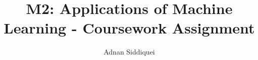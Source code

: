 \documentclass[a4paper,11pt]{article}
\title{\boldmath M2: Applications of Machine Learning - Coursework Assignment}
\author{Adnan Siddiquei}
\affiliation{University of Cambridge}
\begin{document}
\maketitle
\flushbottom






\begin{thebibliography}{99}



\end{thebibliography}
\end{document}
